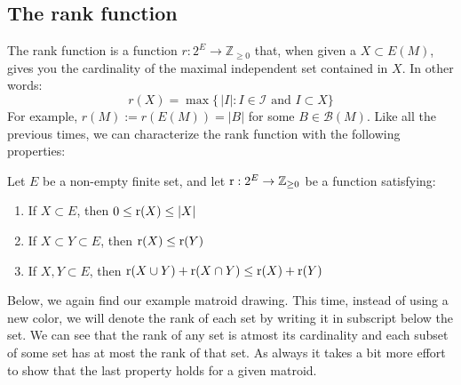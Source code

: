 \subsection{The rank function}

The rank function is a function $r:2^E \rightarrow \mathbb{Z}_{\geq0}$ that, when given a $X\subset E(M)$, gives you the cardinality of the maximal independent set contained in $X$. In other words:
$$ r(X) = \max\{\, |I| : I\in\mathcal{I} \text{ and } I\subset X \} $$
For example, $r(M):=r(E(M))=|B|$ for some $B\in\mathcal{B}(M)$. Like all the previous times, we can characterize the rank function with the following properties:

\begin{defn}
    Let $E$ be a non-empty finite set, and let $\text{r} : 2^E \rightarrow \mathbb{Z}_{\geq0}$ be a function satisfying:
    \begin{enumerate}
        \item If $X\subset E$, then $0 \leq \text{r}(X) \leq |X| $
        \item If $X\subset Y\subset E$, then $\text{r}(X)\leq\text{r}(Y)$
        \item If $X,Y\subset E$, then $\text{r}(X\cup Y)+\text{r}(X\cap Y) \leq \text{r}(X)+\text{r}(Y) $
    \end{enumerate}
\end{defn}

Below, we again find our example matroid drawing. This time, instead of using a new color, we will denote the rank of each set by writing it in subscript below the set. We can see that the rank of any set is atmost its cardinality and each subset of some set has at most the rank of that set. As always it takes a bit more effort to show that the last property holds for a given matroid.

